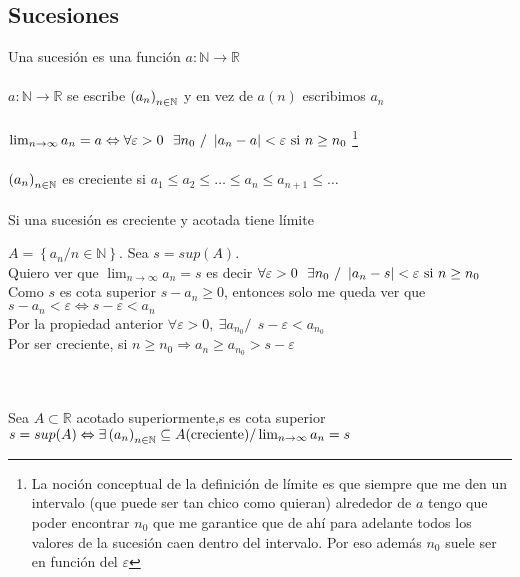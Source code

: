 \documentclass[a4paper,10pt]{article}
\begin{document}
\subsection{Sucesiones}
 Una sucesión es una función $a : \mathbb{N} \longrightarrow \mathbb{R}$ \\ \\
\notacion $a : \mathbb{N} \longrightarrow \mathbb{R}$ se escribe $\left( {a}_{n} \right)_{n \in \mathbb{N}}$ y en vez de $a(n)$ escribimos $a_n$\\ \\
 $\lim_{n \to \infty} a_n = a \Leftrightarrow \forall \varepsilon > 0 \ \ \exists n_0 \ / \ \left\lvert a_n-a\right\rvert < \varepsilon \mbox{ si } n \geq n_0$
\hspace{1em}
\footnote{\label{lim:suc}La noción conceptual de la definición de límite es que siempre que me
den un intervalo (que puede ser tan chico como quieran) alrededor de $a$ tengo
que poder encontrar $n_0$ que me garantice que de ahí para adelante todos los
valores de la sucesión caen dentro del intervalo. Por eso además $n_0$ suele
ser en función del $\varepsilon$} \\ \\  $\left( {a}_{n} \right)_{n \in \mathbb{N}}$ es
creciente si $a_1 \leq a_2 \leq \dots \leq a_n \leq a_{n+1} \leq \dots$ \\ \\
\lema Si una sucesión es creciente y acotada tiene límite
\ifversionlarga
\\
\begin{demo}
	$A=\left\lbrace a_n / n \in \mathbb{N} \right\rbrace$. Sea $s=sup(A)$. \\
	Quiero ver que $\lim_{n \to \infty} a_n = s$ es decir $\forall \varepsilon > 0 \ \ \exists n_0 \ / \ \left\lvert a_n-s\right\rvert < \varepsilon \mbox{ si } n \geq n_0$ \\
	Como $s$ es cota superior $s-a_n \geq 0$, entonces solo me queda ver que $s-a_n < \varepsilon \Leftrightarrow s-\varepsilon < a_n$ \\
	Por la propiedad anterior $\forall \varepsilon > 0, \ \exists a_{n_0} / \ \ s-\varepsilon < a_{n_0}$ \\
	Por ser creciente, si $n \geq n_0 \Rightarrow a_n \geq a_{n_0} > s - \varepsilon$
\end{demo}
\fi
\hspace*{\fill} \\
\hspace*{\fill} \\
\propiedad Sea $A \subset \mathbb{R}$ acotado superiormente,s es cota superior \\ $s = sup(A)
	\Leftrightarrow \exists \left( {a}_{n} \right)_{n \in \mathbb{N}} \subseteq A \mbox{(creciente)} / \lim_{n
	\to \infty} a_n = s$ 
\end{document}
